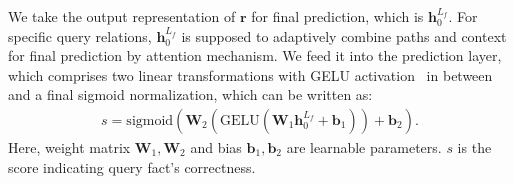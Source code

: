 \documentclass{article}
\begin{document}
We take the output representation of $\mathbf{r}$ for final prediction, which is $\mathbf{h}^{L_f}_0$.
For specific query relations, $\mathbf{h}^{L_f}_0$ is supposed to adaptively combine paths and context for final prediction by attention mechanism\cite{DBLP:conf/nips/VaswaniSPUJGKP17}.
We feed it into the prediction layer, which comprises two linear transformations with GELU activation~\cite{gelu} in between and a final sigmoid normalization, which can be written as:
\begin{align}
    s=\mathrm{sigmoid}(\mathbf{W}_2(\mathrm{GELU}(\mathbf{W}_1\mathbf{h}^{L_f}_0+\mathbf{b}_1))+\mathbf{b}_2).
\end{align}
Here, weight matrix $\mathbf{W}_1,\mathbf{W}_2$ and bias $\mathbf{b}_1,\mathbf{b}_2$ are learnable parameters. $s$ is the score indicating query fact's correctness.
 
\end{document}
